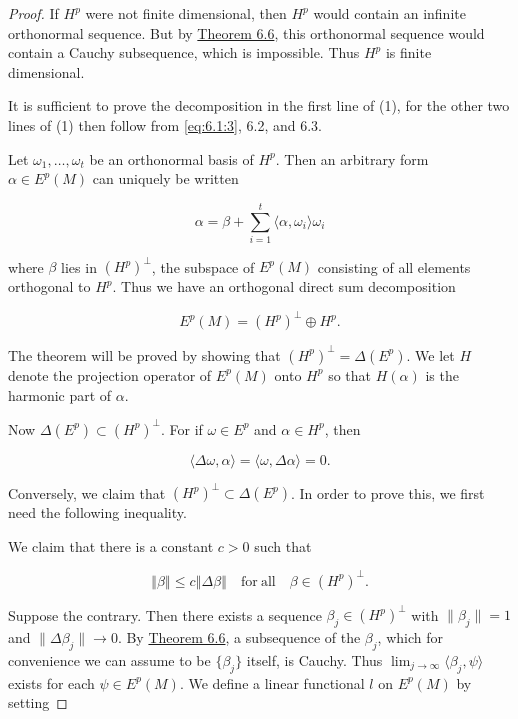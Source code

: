\begin{proof}
If $H^{p}$ were not finite dimensional, then $H^{p}$ would contain an infinite orthonormal sequence. But by \hyperref[thm:6.6]{Theorem 6.6}, this orthonormal sequence would contain a Cauchy subsequence, which is impossible. Thus $H^{p}$ is finite dimensional.

It is sufficient to prove the decomposition in the first line of (1), for the other two lines of (1) then follow from \eqref{eq:6.1:3}, 6.2, and 6.3.

Let  $ \omega_1, \ldots, \omega_t $ be an orthonormal basis of  $ H^p $. Then an arbitrary form  $ \alpha \in E^p(M) $ can uniquely be written

\begin{equation}
\tag{2}\label{eq:6.8:2}
\alpha=\beta+\sum_{i=1}^{t}\langle\alpha,\omega_{i}\rangle\omega_{i}
\end{equation}

where $\beta$ lies in $(H^{p})^{\perp}$, the subspace of $E^{p}(M)$ consisting of all elements orthogonal to $H^{p}$. Thus we have an orthogonal direct sum decomposition

\begin{equation}
\tag{3}\label{eq:6.8:3}
E^{p}(M)=(H^{p})^{\perp}\oplus H^{p}.
\end{equation}

The theorem will be proved by showing that  $ (H^{p})^{\perp} = \Delta(E^{p}) $. We let $H$ denote the projection operator of $E^{p}(M)$ onto $H^{p}$ so that $H(\alpha)$ is the harmonic part of $\alpha$.

Now  $ \Delta(E^p) \subset (H^p)^\perp $. For if  $ \omega \in E^p $ and  $ \alpha \in H^p $, then

\[
\langle\Delta\omega,\alpha\rangle=\langle\omega,\Delta\alpha\rangle=0.
\]

Conversely, we claim that  $ (H^p)^\perp \subset \Delta(E^p) $. In order to prove this, we first need the following inequality.

We claim that there is a constant $c>0$ such that

\begin{equation}
\tag{4}\label{eq:6.8:4}
\left\Vert\beta\right\Vert\leq c\left\Vert\Delta\beta\right\Vert\quad\mathrm{for\ all}\quad\beta\in(H^{p})^{\bot}.
\end{equation}

Suppose the contrary. Then there exists a sequence  $ \beta_j \in (H^p)^\perp $ with  $ \|\beta_j\| = 1 $ and  $ \|\Delta\beta_j\| \to 0 $. By \hyperref[thm:6.6]{Theorem 6.6}, a subsequence of the  $ \beta_j $, which for convenience we can assume to be  $ \{\beta_j\} $ itself, is Cauchy. Thus  $ \lim_{j \to \infty} \langle \beta_j, \psi \rangle $ exists for each  $ \psi \in E^p(M) $. We define a linear functional  $ l $ on  $ E^p(M) $ by setting


\end{proof}
